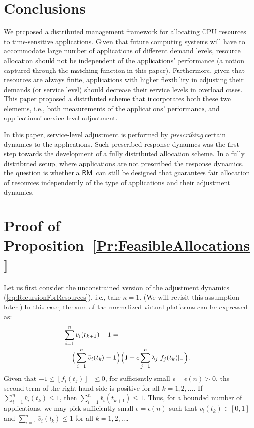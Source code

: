 \documentclass[letter,11pt]{article}
\begin{document}
\section{Conclusions}
\label{sec:conc}

We proposed a distributed management framework for allocating CPU resources to time-sensitive applications. Given that future computing systems will have to accommodate large number of applications of different demand levels, resource allocation should not be independent of the applications' performance (a notion captured through the matching function in this paper). Furthermore, given that resources are always finite, applications with higher flexibility in adjusting their demands (or service level) should decrease their service levels in overload cases. This paper proposed a distributed scheme that incorporates both these two elements, i.e., both measurements of the applications' performance, and applications' service-level adjustment. 

In this paper, service-level adjustment is performed by \textit{prescribing} certain dynamics to the applications. Such prescribed response dynamics was the first step towards the development of a fully distributed allocation scheme. In a fully distributed setup, where applications are not prescribed the response dynamics, the question is whether a {$\mathsf{RM}$}\ can still be designed that guarantees fair allocation of resources independently of the type of applications and their adjustment dynamics. 

\appendix

\section{Proof of Proposition~\ref{Pr:FeasibleAllocations}}	\label{Ap:FeasibleAllocations}

Let us first consider the unconstrained version of the adjustment dynamics (\ref{eq:RecursionForResources}), i.e., take $\kappa=1$. (We will revisit this assumption later.) In this case, the sum of the normalized virtual platforms can be expressed as:
\begin{eqnarray*}
 \lefteqn{\sum_{i=1}^{n}{\bar{v}}_i(t_{k+1}) - 1 =}\cr && \Big(\sum_{i=1}^{n}{\bar{v}}_i(t_{k}) - 1\Big)\Big(1 + \epsilon \sum_{j=1}^{n}\lambda_j{[{f_j(t_k)}]_{-}}\Big).
\end{eqnarray*}
Given that $-1\leq {[{f_i(t_k)}]_{-}} \leq 0$, for sufficiently small $\epsilon=\epsilon(n)>0$, the second term of the right-hand side is positive for all $k=1,2,...$. If $\sum_{i=1}^{n}{\bar{v}}_i(t_k) \leq 1$, then $\sum_{i=1}^{n}{\bar{v}}_i(t_{k+1}) \leq 1$. Thus, for a bounded number of applications, we may pick sufficiently small $\epsilon=\epsilon(n)$ such that ${\bar{v}}_i(t_k)\in[0,1]$ and $\sum_{i=1}^{n}{\bar{v}}_i(t_k) \leq 1$ for all $k=1,2,...$.
 
\end{document}
